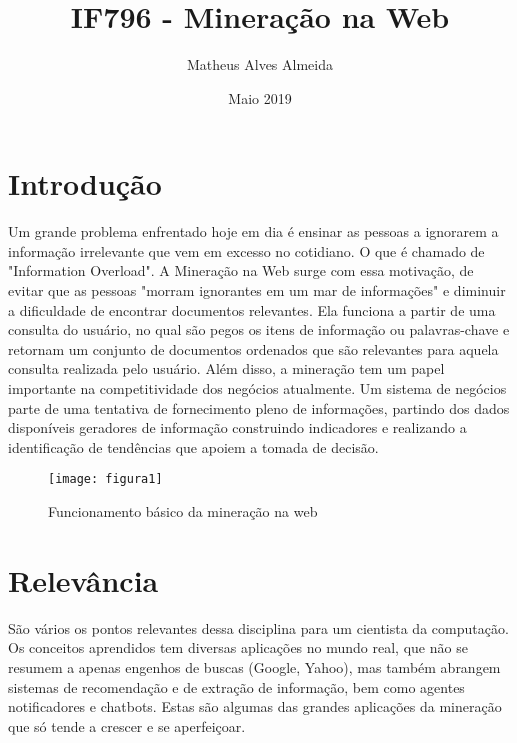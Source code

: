 \documentclass{article}
\title{IF796 - Mineração na Web}
\author{Matheus Alves Almeida }
\date{Maio 2019}
\begin{document}
\maketitle

\section{Introdução}
Um grande problema enfrentado hoje em dia é ensinar as pessoas a ignorarem a informação irrelevante que vem em excesso no cotidiano. O que é chamado de "Information Overload"\citep{r2}. 
A Mineração na Web surge com essa motivação, de evitar que as pessoas "morram ignorantes em um mar de informações" e diminuir a dificuldade de encontrar documentos relevantes\citep{r1}. Ela funciona a partir de uma consulta do usuário, no qual são pegos os itens de informação ou palavras-chave e retornam um conjunto de documentos ordenados que são relevantes para aquela consulta realizada pelo usuário\citep{r3}. Além disso, a mineração tem um papel importante na competitividade dos negócios atualmente. Um sistema de negócios parte de uma tentativa de fornecimento pleno de informações, partindo dos dados disponíveis geradores de informação construindo indicadores e realizando a identificação de tendências que apoiem a tomada de decisão.   

\begin{figure}[h!]
\centering
\texttt{[image: figura1]}
\caption{Funcionamento básico da mineração na web\citep{r2}}
\label{fig:figura1}
\end{figure}

\section{Relevância}
São vários os pontos relevantes dessa disciplina para um cientista da computação. Os conceitos aprendidos tem diversas aplicações no mundo real, que não se resumem a apenas engenhos de buscas (Google, Yahoo), mas também abrangem sistemas de recomendação e de extração de informação, bem como agentes notificadores e chatbots. Estas são algumas das grandes aplicações da mineração que só tende a crescer e se aperfeiçoar.       
\end{document}

